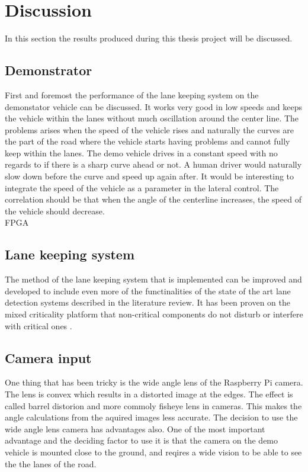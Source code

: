 \chapter{Discussion}
In this section the results produced during this thesis project will be discussed.
\section{Demonstrator}
First and foremost the performance of the lane keeping system on the demonstator vehicle can be discussed. It works very good in low speeds and keeps the vehicle within the lanes without much oscillation around the center line. The problems arises when the speed of the vehicle rises and naturally the curves are the part of the road where the vehicle starts having problems and cannot fully keep within the lanes. The demo vehicle drives in a constant speed with no regards to if there is a sharp curve ahead or not. A human driver would naturally slow down before the curve and speed up again after. It would be interesting to integrate the speed of the vehicle as a parameter in the lateral control. The correlation should be that when the angle of the centerline increases, the speed of the vehicle should decrease. \\


FPGA\\

\section{Lane keeping system}
The method of the lane keeping system that is implemented can be improved and developed to include even more of the functinalities of the state of the art lane detection systems described in the literature review. It has been proven on the mixed criticality platform that non-critical components do not disturb or interfere with critical ones \cite{zaki2016}.\\

\section{Camera input}
One thing that has been tricky is the wide angle lens of the Raspberry Pi camera. The lens is convex which results in a distorted image at the edges. The effect is called barrel distorion and more commoly fisheye lens in cameras. This makes the angle calculations from the aquired images less accurate. The decision to use the wide angle lens camera has advantages also. One of the most important advantage and the deciding factor to use it is that the camera on the demo vehicle is mounted close to the ground, and reqires a wide vision to be able to see the the lanes of the road.\\

